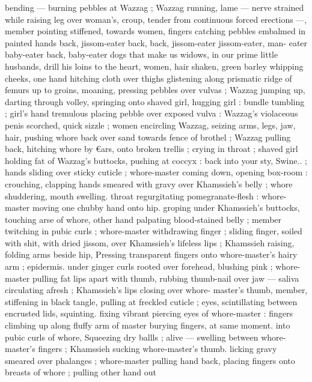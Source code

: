 bending --- burning pebbles at Wazzag ; Wazzag running, lame --- 
nerve strained while raising leg over woman's, croup, tender from 
continuous forced erections ---, member pointing stiffened, towards 
women, fingers catching pebbles embalmed in painted hands{\thd} 
{\gl}{\thd}back, jissom-eater{\td} back, back, jissom-eater{\td} jissom-eater, man- 
eater{\thd} baby-eater{\td} back, baby-eater{\thd} dogs that make us widows, in 
our prime{\thd} little husbands, drill his loins to the heart{\thd}{\gr}, women, 
hair shaken, green barley whipping cheeks, one hand hitching cloth 
over thighs glistening along prismatic ridge of femurs up to groins, 
moaning, pressing pebbles over vulvas ; Wazzag jumping up, darting 
through volley, springing onto shaved girl, hugging girl : bundle 
tumbling ; girl's hand tremulous placing pebble over exposed vulva : 
Wazzag's violaceous penis scorched, quick sizzle ; women encircling 
Wazzag, seizing arms, legs, jaw, hair, pushing whore back over sand 
towards fence of brothel ; Wazzag pulling back, hitching whore by 
€ars, onto broken trellis ; crying in throat ; shaved girl holding fat of 
Wazzag's buttocks, pushing at coccyx : {\td} {\gl}{\td} back into your sty, 
Swine..{\gr} ; hands sliding over sticky cuticle ; whore-master coming 
down, opening box-room : crouching, clapping hands smeared with 
gravy over Khamssieh's belly ; whore shuddering, mouth swelling. 
throat regurgitating pomegranate-flesh : whore-master moving one 
chubby hand onto hip. groping under Khamssieh's buttocks, touching 
arse of whore, other hand palpating blood-stained belly ; member 
twitching in pubic curls ; whore-master withdrawing finger ; sliding 
finger, soiled with shit, with dried jissom, over Khamssieh's lifeless 
lips ; Khamssieh raising, folding arms beside hip, Pressing 
transparent fingers onto whore-master's hairy arm ; epidermis. 
under ginger curls rooted over forehead, blushing pink ; whore- 
master pulling fat lips apart with thumb, rubbing thumb-nail over jaw 
--- saliva circulating afresh ; Khamssieh's lips closing over whore- 
master's thumb, member, stiffening in black tangle, pulling at 
freckled cuticle ; eyes, scintillating between encrusted lids, squinting. 
fixing vibrant piercing eyes of whore-master : fingers climbing up 
along fluffy arm of master burying fingers, at same moment. into 
pubic curls of whore, Squeezing dry ballls ; alive --- swelling between 
whore-master's fingers ; Khamssieh sucking whore-master's thumb. 
licking gravy smeared over phalanges ; whore-master pulling hand 
back, placing fingers onto breasts of whore ; pulling other hand out 
